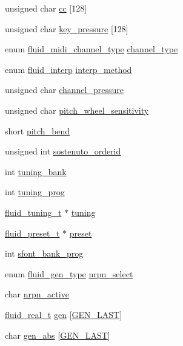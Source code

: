 \begin{DoxyCompactItemize}
unsigned char \hyperlink{struct__fluid__channel__t_a22b7e9b2df7359ccce7bbbaaed20c288}{cc} \mbox{[}128\mbox{]}
\item 
unsigned char \hyperlink{struct__fluid__channel__t_a037c414f8c0c4f00e6d58d1d5a61c342}{key\+\_\+pressure} \mbox{[}128\mbox{]}
\item 
enum \hyperlink{synth_8h_aada0747654fce5d0a758126fc3c99eb0}{fluid\+\_\+midi\+\_\+channel\+\_\+type} \hyperlink{struct__fluid__channel__t_a4271a20a753cabb7567ad69c50d18009}{channel\+\_\+type}
\item 
enum \hyperlink{synth_8h_a4a2efef77b267500dd9c19c0dc9e4633}{fluid\+\_\+interp} \hyperlink{struct__fluid__channel__t_ae4a627af22784d61c352d8ed468fa619}{interp\+\_\+method}
\item 
unsigned char \hyperlink{struct__fluid__channel__t_a4e1d2088d5abab40b071df043922f916}{channel\+\_\+pressure}
\item 
unsigned char \hyperlink{struct__fluid__channel__t_a7801378c076bac4067765629e6cd1791}{pitch\+\_\+wheel\+\_\+sensitivity}
\item 
short \hyperlink{struct__fluid__channel__t_a086fca7239fb592a66840ef28f584608}{pitch\+\_\+bend}
\item 
unsigned int \hyperlink{struct__fluid__channel__t_adfeeecfcc5cb42e73bc1bd9215800262}{sostenuto\+\_\+orderid}
\item 
int \hyperlink{struct__fluid__channel__t_a91209b882ecd399c0ea2db9fefe9fd2f}{tuning\+\_\+bank}
\item 
int \hyperlink{struct__fluid__channel__t_a9407c86a964afd9a593d7ef02e2ed6a9}{tuning\+\_\+prog}
\item 
\hyperlink{fluidsynth__priv_8h_a06e93e369a12dcdcf9a7c9312622e732}{fluid\+\_\+tuning\+\_\+t} $\ast$ \hyperlink{struct__fluid__channel__t_a7cc9c94f6463dc48abc6b86d84deca80}{tuning}
\item 
\hyperlink{types_8h_a985e5ee05f433da841127750f67a4723}{fluid\+\_\+preset\+\_\+t} $\ast$ \hyperlink{struct__fluid__channel__t_a6b807216a860b49ea028e97e7e140578}{preset}
\item 
int \hyperlink{struct__fluid__channel__t_ab713993aae83058a1beeda3dd5627201}{sfont\+\_\+bank\+\_\+prog}
\item 
enum \hyperlink{gen_8h_ad17a24ae3b25f3b8cc5762f818eef9b4}{fluid\+\_\+gen\+\_\+type} \hyperlink{struct__fluid__channel__t_ac720293973b9120baa9ebfef708f9d5d}{nrpn\+\_\+select}
\item 
char \hyperlink{struct__fluid__channel__t_a63f95ccd8c4f3f44df1b2e469f1795c6}{nrpn\+\_\+active}
\item 
\hyperlink{fluidsynth__priv_8h_a9e96f0917747b69cabb7c671bc693dbb}{fluid\+\_\+real\+\_\+t} \hyperlink{struct__fluid__channel__t_a8371721c75d8302750bf8c0c45fc2c76}{gen} \mbox{[}\hyperlink{gen_8h_ad17a24ae3b25f3b8cc5762f818eef9b4a9c372c341b7b1a718f0016f40c615cf3}{G\+E\+N\+\_\+\+L\+A\+ST}\mbox{]}
\item 
char \hyperlink{struct__fluid__channel__t_a431e65009fa1c73f277b141690f0a812}{gen\+\_\+abs} \mbox{[}\hyperlink{gen_8h_ad17a24ae3b25f3b8cc5762f818eef9b4a9c372c341b7b1a718f0016f40c615cf3}{G\+E\+N\+\_\+\+L\+A\+ST}\mbox{]}
\end{DoxyCompactItemize}


